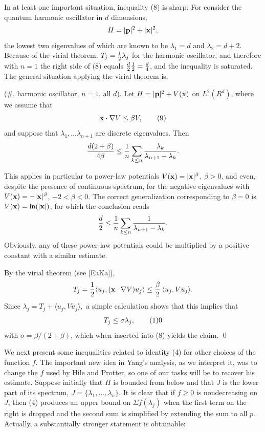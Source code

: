 In at least one important situation, inequality (8) is sharp.  
For consider the 
quantum harmonic oscillator in $d$ dimensions, 
$$
H = |{\bold p}|^2 + |{\bold x}|^2,
$$
the lowest two eigenvalues of which are known to be 
$\lambda_1 = d$ and 
$\lambda_2 = d+2$. Because of the virial theorem, $T_j = {1\over 2} 
\lambda_{j}$ for the harmonic oscillator, and therefore with $n=1$ the right 
side of (8) equals  ${d\over 2}{1\over 2} ={d\over4}$, and the 
inequality is saturated.  The 
general situation applying the virial theorem is: 

 (\#, harmonic oscillator, $n=1$, all $d$).  
Let $H =   |{\bold p}|^2 + V({\bold x})$ on 
$L^2(R^d)$, where we assume that
$${\bold x}\cdot \nabla V   \le  \beta V,          
\tag 9$$
and suppose that $\lambda_1, \dots \lambda_{n+1}$ 
are discrete eigenvalues.  
Then 
$$
{d(2+\beta) \over 4\beta }\le{1 \over 
n}\sum\limits_{k\le n}{\lambda _k \over \lambda 
_{n+1} -\lambda_k}.$$
\endproclaim

This applies in particular to power-law potentials $V({\bold x}) =  
|{\bold x}|^{\beta}$, $\beta > 0$, 
and even, despite the presence of continuous 
spectrum, for the negative eigenvalues with 
$V({\bold x}) = - |{\bold x}|^{\beta}$, 
$-2 < \beta < 0$.  The correct generalization 
corresponding to $\beta =0$ is 
$V({\bold x}) = \ln(|{\bold x}|)$, for which the conclusion reads
$${d \over 2} \le  {1 \over n}\sum\limits_{k\le n}{
1 \over \lambda_{n+1} - \lambda_k}. $$
Obviously, any of these power-law potentials could be multiplied by a 
positive constant with a similar estimate.
\endremark

By the virial theorem (see [EaKa]), 
$$T_j=
{1\over 2} \langle u_j,({\bold x}\cdot\nabla V)u_j\rangle\le{\beta\over
2}\,\langle u_j,Vu_j\rangle.$$
Since  ${\lambda }_{j} ={T}_{j} +\langle u_j, V 
u_j\rangle,$ a simple calculation shows that this implies that 
$${T}_{j}\le \sigma {\lambda }_{j },
	 \tag 10$$
with $\sigma=\beta /(2+\beta )$, which when inserted into (8) yields 
the claim. 
\hfill\qed\enddemo


We next present some inequalities related to 
identity (4) for other choices of 
the function $f$.  
The important new idea in Yang's analysis, as we interpret 
it, was to change the $f$ 
used by Hile and Protter, so one of our tasks will be 
to recover his estimate.  Suppose initially that $H$ 
is bounded from below and 
that $J$ is the lower part of its spectrum, 
$J = \{\lambda_1, \dots, 
\lambda_n\}$.  It is clear that if $f \ge 0$ 
is nondecreasing on $J$, then (4) 
produces an upper bound on $\Sigma f(\lambda_{j})$ when the first term 
on the right is dropped and the second sum is simplified by extending the 
sum to all $p$.  
Actually, a substantially stronger statement is obtainable:

